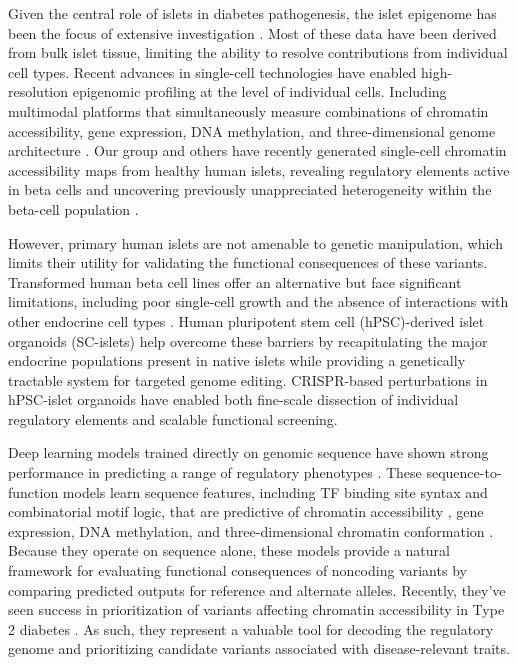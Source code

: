 Given the central role of islets in diabetes pathogenesis, the islet epigenome has been the focus of extensive investigation \cite{Pasquali2014-cu,Gaulton2010-mq,Greenwald2019-ou,Khetan2018-fm,Thurner2018-ln,Volkov2017-tz}. Most of these data have been derived from bulk islet tissue, limiting the ability to resolve contributions from individual cell types. Recent advances in single-cell technologies have enabled high-resolution epigenomic profiling at the level of individual cells. Including multimodal platforms that simultaneously measure combinations of chromatin accessibility, gene expression, DNA methylation, and three-dimensional genome architecture \cite{Lee2019-qo,Liu2021-km}. Our group and others have recently generated single-cell chromatin accessibility maps from healthy human islets, revealing regulatory elements active in beta cells and uncovering previously unappreciated heterogeneity within the beta-cell population \cite{Chiou2021-ro,Rai2020-cf,Wang2023-me}.

However, primary human islets are not amenable to genetic manipulation, which limits their utility for validating the functional consequences of these variants. Transformed human beta cell lines \cite{Ravassard2011-lj} offer an alternative but face significant limitations, including poor single-cell growth and the absence of interactions with other endocrine cell types \cite{Rutter2013-yv}. Human pluripotent stem cell (hPSC)-derived islet organoids (SC-islets) help overcome these barriers by recapitulating the major endocrine populations present in native islets \cite{Hogrebe2020-rr,Rezania2014-nz,Veres2019-qb,Velazco-Cruz2019-yq,Zhu2023-qm} while providing a genetically tractable system for targeted genome editing. CRISPR-based perturbations in hPSC-islet organoids have enabled both fine-scale dissection of individual regulatory elements and scalable functional screening.

Deep learning models trained directly on genomic sequence have shown strong performance in predicting a range of regulatory phenotypes \cite{Sasse2024-ly}. These sequence-to-function models learn sequence features, including TF binding site syntax and combinatorial motif logic, that are predictive of chromatin accessibility \cite{Pampari2025-lm}, gene expression\cite{Linder2025-or}, DNA methylation\cite{Zeng2017-kb}, and three-dimensional chromatin conformation \cite{Fudenberg2020-gs}. Because they operate on sequence alone, these models provide a natural framework for evaluating functional consequences of noncoding variants by comparing predicted outputs for reference and alternate alleles. Recently, they’ve seen success in prioritization of variants affecting chromatin accessibility in Type 2 diabetes \cite{Hudaiberdiev2023-ew}. As such, they represent a valuable tool for decoding the regulatory genome and prioritizing candidate variants associated with disease-relevant traits. 

